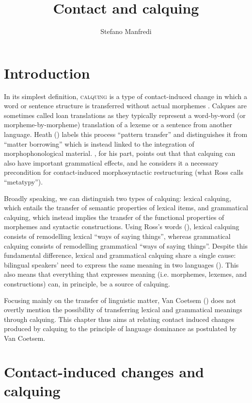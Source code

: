 \documentclass[output=paper]{langsci/langscibook}
\author{Stefano Manfredi\affiliation{CNRS, SeDyL}}
\title{Contact and calquing}
\begin{document}
\maketitle 
  

\section{Introduction}

In its simplest definition, \textsc{calquing} is a type of contact-induced change in which a word or sentence structure is transferred without actual morphemes \citep[260]{Thomason2001}. Calques are sometimes called loan translations as they typically represent a word-by-word (or morpheme-by-morpheme) translation of a lexeme or a sentence from another language. Heath (\citeyear[367]{Heath1984}) labels this process “pattern transfer” and distinguishes it from “matter borrowing” which is instead linked to the integration of morphophonological material. \cite{Ross2007}, for his part, points out that that calquing can also have important grammatical effects, and he considers it a necessary precondition for contact-induced morphosyntactic restructuring (what Ross calls “metatypy”).  

Broadly speaking, we can distinguish two types of calquing: lexical calquing, which entails the transfer of semantic properties of lexical items, and grammatical calquing, which instead implies the transfer of the functional properties of morphemes and syntactic constructions. Using Ross’s words (\citeyear[126]{Ross2007}), lexical calquing consists of remodelling lexical “ways of saying things”, whereas grammatical calquing consists of remodelling grammatical “ways of saying things”. Despite this fundamental difference, lexical and grammatical calquing share a single cause: bilingual speakers’ need to express the same meaning in two languages (\citealt[32]{Sasse1992}). This also means that everything that expresses meaning (i.e. morphemes, lexemes, and constructions) can, in principle, be a source of calquing. 

Focusing mainly on the transfer of linguistic matter, Van Coetsem (\citeyear{VanCoetsem1988}) does not overtly mention the possibility of transferring lexical and grammatical meanings through calquing. This chapter thus aims at relating contact induced changes produced by calquing to the principle of language dominance as postulated by Van Coetsem. 


 \section{Contact-induced changes and calquing}
\end{document}
